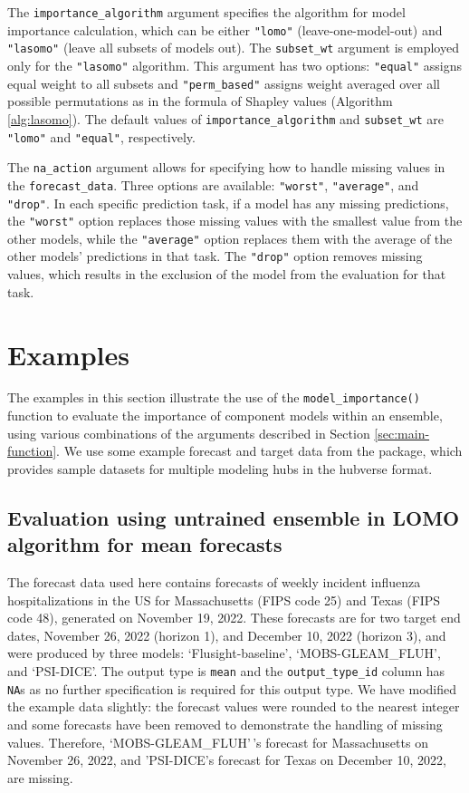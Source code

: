 \documentclass[
  article,
  shortnames,
  notitle]{jss}
\begin{document}
The \texttt{importance\_algorithm} argument specifies the algorithm for
model importance calculation, which can be either \texttt{"lomo"}
(leave-one-model-out) and \texttt{"lasomo"} (leave all subsets of models
out). The \texttt{subset\_wt} argument is employed only for the
\texttt{"lasomo"} algorithm. This argument has two options:
\texttt{"equal"} assigns equal weight to all subsets and
\texttt{"perm\_based"} assigns weight averaged over all possible
permutations as in the formula of Shapley values (Algorithm
\ref{alg:lasomo}). The default values of \texttt{importance\_algorithm}
and \texttt{subset\_wt} are \texttt{"lomo"} and \texttt{"equal"},
respectively.

The \texttt{na\_action} argument allows for specifying how to handle
missing values in the \texttt{forecast\_data}. Three options are
available: \texttt{"worst"}, \texttt{"average"}, and \texttt{"drop"}. In
each specific prediction task, if a model has any missing predictions,
the \texttt{"worst"} option replaces those missing values with the
smallest value from the other models, while the \texttt{"average"}
option replaces them with the average of the other models' predictions
in that task. The \texttt{"drop"} option removes missing values, which
results in the exclusion of the model from the evaluation for that task.

\section{Examples}\label{sec:examples}

The examples in this section illustrate the use of the
\texttt{model\_importance()} function to evaluate the importance of
component models within an ensemble, using various combinations of the
arguments described in Section \ref{sec:main-function}. We use some
example forecast and target data from the  package,
which provides sample datasets for multiple modeling hubs in the
hubverse format.

\subsection{Evaluation using untrained ensemble in LOMO algorithm for
mean forecasts}\label{sec:untrained-lomo-mean}

The forecast data used here contains forecasts of weekly incident
influenza hospitalizations in the US for Massachusetts (FIPS code 25)
and Texas (FIPS code 48), generated on November 19, 2022. These
forecasts are for two target end dates, November 26, 2022 (horizon 1),
and December 10, 2022 (horizon 3), and were produced by three models:
`Flusight-baseline', `MOBS-GLEAM\_FLUH', and `PSI-DICE'. The output type
is \texttt{mean} and the \texttt{output\_type\_id} column has
\texttt{NA}s as no further specification is required for this output
type. We have modified the example data slightly: the forecast values
were rounded to the nearest integer and some forecasts have been removed
to demonstrate the handling of missing values. Therefore,
`MOBS-GLEAM\_FLUH'\,'s forecast for Massachusetts on November 26, 2022,
and 'PSI-DICE's forecast for Texas on December 10, 2022, are missing.
\end{document}

